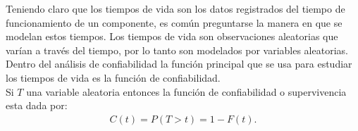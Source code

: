 \noindent Teniendo claro que los tiempos de vida son los datos registrados del tiempo de funcionamiento de un  componente, es com\'un preguntarse la manera en que se modelan estos tiempos.  Los tiempos de vida son observaciones aleatorias que var\'ian a trav\'es del tiempo, por lo tanto son modelados por variables aleatorias. 
%
%
%
%
%
%
%
%
%
\noindent Dentro del an\'alisis de confiabilidad la funci\'on principal que se usa para estudiar los tiempos de vida es la funci\'on de confiabilidad.\\[0.1cm]
\noindent Si $T$ una variable aleatoria entonces la funci\'on de confiabilidad o supervivencia esta dada por:
\begin{eqnarray}\label{confiabi}
 C(t)=P(T>t)=1-F(t).
\end{eqnarray}



